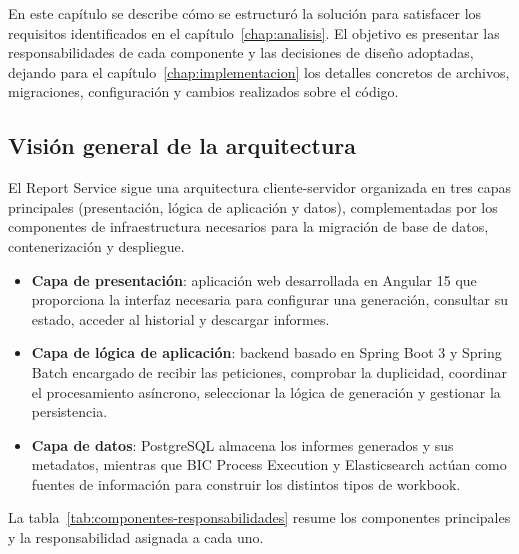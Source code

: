\documentclass[11pt,a4paper,titlepage,oneside]{report}
\begin{document}
En este capítulo se describe cómo se estructuró la solución para satisfacer los
requisitos identificados en el capítulo~\ref{chap:analisis}. El objetivo es
presentar las responsabilidades de cada componente y las decisiones de diseño
adoptadas, dejando para el capítulo~\ref{chap:implementacion} los detalles
concretos de archivos, migraciones, configuración y cambios realizados sobre el
código.

\subsection{Visión general de la arquitectura}

El Report Service sigue una arquitectura cliente-servidor organizada en tres
capas principales (presentación, lógica de aplicación y datos),
complementadas por los componentes de infraestructura necesarios para la
migración de base de datos, contenerización y despliegue.

\begin{itemize}

  \item \textbf{Capa de presentación}: aplicación web desarrollada en Angular
  15 que proporciona la interfaz necesaria para configurar una generación,
  consultar su estado, acceder al historial y descargar informes.

  \item \textbf{Capa de lógica de aplicación}: backend basado en Spring Boot 3
  y Spring Batch encargado de recibir las peticiones, comprobar la duplicidad,
  coordinar el procesamiento asíncrono, seleccionar la lógica de generación y
  gestionar la persistencia.

  \item \textbf{Capa de datos}: PostgreSQL almacena los informes generados y sus
  metadatos, mientras que BIC Process Execution y Elasticsearch actúan como
  fuentes de información para construir los distintos tipos de workbook.

\end{itemize}

La tabla~\ref{tab:componentes-responsabilidades} resume los componentes
principales y la responsabilidad asignada a cada uno.
\end{document}
